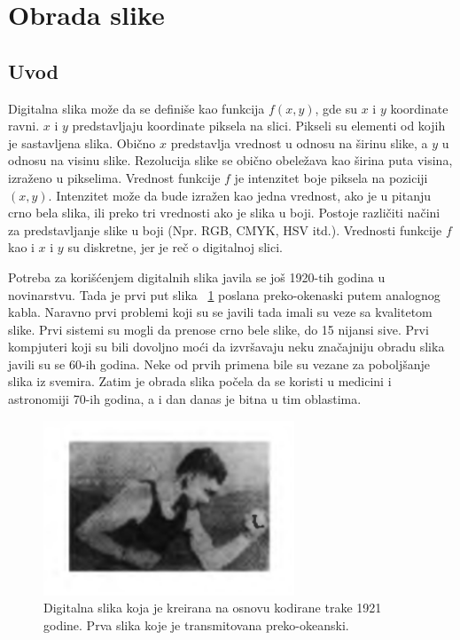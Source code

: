 \documentclass[a4paper,12pt,titlepage]{article}
\begin{document}
\section{Obrada slike}%

\subsection{Uvod}%

Digitalna slika može da se definiše kao funkcija $f(x, y)$, gde su $x$ i $y$ koordinate ravni. $x$ i $y$ predstavljaju koordinate piksela na slici. Pikseli su elementi od kojih je sastavljena slika. Obično $x$ predstavlja vrednost u odnosu na širinu slike, a $y$ u odnosu na visinu slike. Rezolucija slike se obično obeležava kao širina puta visina, izraženo u pikselima. Vrednost funkcije $f$ je intenzitet boje piksela na poziciji $(x, y)$. Intenzitet može da bude izražen kao jedna vrednost, ako je u pitanju crno bela slika, ili preko tri vrednosti ako je slika u boji. Postoje različiti načini za predstavljanje slike u boji (Npr. RGB, CMYK, HSV itd.). Vrednosti funkcije $f$ kao i $x$ i $y$ su diskretne, jer je reč o digitalnoj slici. 
 
Potreba za korišćenjem digitalnih slika javila se još 1920-tih godina u novinarstvu. Tada je prvi put slika ~\ref{slika1921} poslana preko-okenaski putem analognog kabla. Naravno prvi problemi koji su se javili tada imali su veze sa kvalitetom slike. Prvi sistemi su mogli da prenose crno bele slike, do 15 nijansi sive. Prvi kompjuteri koji su bili dovoljno moći da izvršavaju neku značajniju obradu slika javili su se 60-ih godina. Neke od prvih primena bile su vezane za poboljšanje slika iz svemira. Zatim je obrada slika počela da se koristi u medicini i astronomiji 70-ih godina, a i dan danas je bitna u tim oblastima.

\begin{figure}[ht!]
\centering
\includegraphics[width=75mm]{img/prvaPrenesenaSlika.png}
\caption{Digitalna slika koja je kreirana na osnovu kodirane trake 1921 godine. Prva slika koje je transmitovana preko-okeanski.}
\label{slika1921}
\end{figure} 
\end{document}
